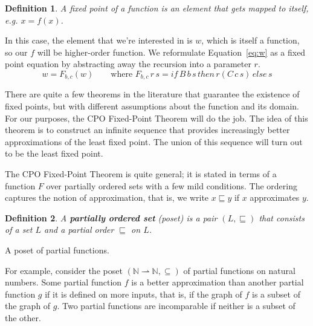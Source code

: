 \documentclass{tufte-handout}
\newtheorem{definition}{Definition}%
\begin{document}
\begin{definition}
A \emph{fixed point of a function} is an element that gets mapped to
itself, e.g. $x = f(x)$. 
\end{definition}

In this case, the element that we're interested in is $w$, which is
itself a function, so our $f$ will be higher-order function. We
reformulate Equation~\ref{eq:w} as a fixed point equation by
abstracting away the recursion into a parameter $r$.
\begin{equation} \label{eq:while}
  w = F_{b,c}(w)
  \qquad
  \text{where }
  F_{b,c}\,r\,s = \mathit{if}\, B\,b\,s \,\mathit{then}\, r(C\,c\,s)\,\mathit{else}\,s
\end{equation}

There are quite a few theorems in the literature that guarantee the
existence of fixed points, but with different assumptions about the
function and its domain. For our purposes, the CPO Fixed-Point Theorem
will do the job. The idea of this theorem is to construct an infinite
sequence that provides increasingly better approximations of the least
fixed point. The union of this sequence will turn out to be the least
fixed point.

The CPO Fixed-Point Theorem is quite general; it is stated in terms of
a function $F$ over partially ordered sets with a few mild conditions.
The ordering captures the notion of approximation, that is, we write
$x \sqsubseteq y$ if $x$ approximates $y$.

\begin{definition}
  A \textbf{\emph{partially ordered set}} (poset) is a pair
  $(L,\sqsubseteq)$ that consists of a set $L$ and a partial order
  $\sqsubseteq$ on $L$.
\end{definition}

\begin{marginfigure}
\centering\large
{}
\caption{A poset of partial functions.}
\label{fig:poset-of-partial-functions}
\end{marginfigure}
%
For example, consider the poset
$(\mathbb{N}{\rightharpoonup}\mathbb{N}, \subseteq)$ of partial
functions on natural numbers. Some partial function $f$ is a better
approximation than another partial function $g$ if it is defined on
more inputs, that is, if the graph of $f$ is a subset of the graph of
$g$.  Two partial functions are incomparable if neither is a subset of
the other.
\end{document}
